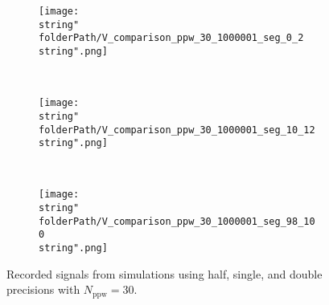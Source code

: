 

\renewcommand{\folderPath}{\string"./fig/1D_example/validate/dt_dx/comparison/plot_dt_h_10_9p997558593749999e-05_dt_h_30_9p997558593749999e-05_dt_h_50_9p997558593749999e-05/half_naive_chop_D_3_chop_dt_dx_3_single_double/\string"}


\hspace{-0.05\textwidth}
\begin{minipage}[t]{.5\textwidth}
%
\begin{figure}[H]
\captionsetup{width=0.95\textwidth,font=footnotesize,labelfont=footnotesize}
\centering
%
\begin{subfigure}[b]{1\textwidth}
%
\centering\texttt{[image: \\string"\\folderPath/V\_comparison\_ppw\_30\_1000001\_seg\_0\_2\\string".png]}
%
\end{subfigure}\hfill
\\[2ex]
%
\begin{subfigure}[b]{1\textwidth}
%
\centering\texttt{[image: \\string"\\folderPath/V\_comparison\_ppw\_30\_1000001\_seg\_10\_12\\string".png]}
%
\end{subfigure}\hfill
\\[2ex]
%
\begin{subfigure}[b]{1\textwidth}
%
\centering\texttt{[image: \\string"\\folderPath/V\_comparison\_ppw\_30\_1000001\_seg\_98\_100\\string".png]}
%
\end{subfigure}\hfill
%
\caption{Recorded signals from simulations using half, single, and double precisions with $N_\text{ppw}=30$.}
\label{comparison_V_half_naive_segments_D_3_dt_dx_3_ppw_30}
\end{figure}
%
\end{minipage}
%
\hfill %
%
